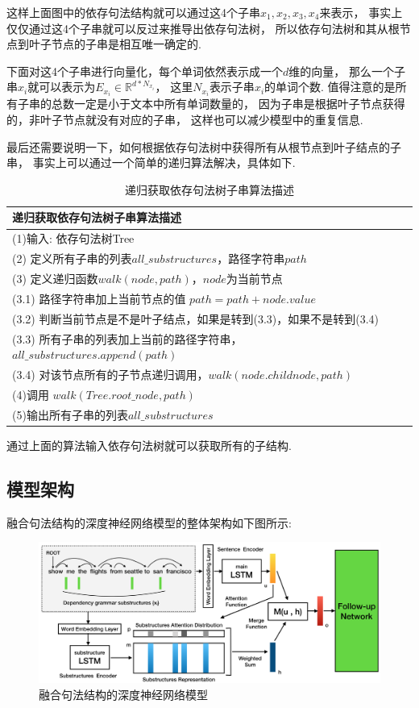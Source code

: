 \documentclass[bachelor,adobefonts]{jnuthesis}
\begin{document}
这样上面图中的依存句法结构就可以通过这4个子串$x_{1},x_{2},x_{3},x_{4}$来表示，
事实上仅仅通过这4个子串就可以反过来推导出依存句法树，
所以依存句法树和其从根节点到叶子节点的子串是相互唯一确定的.

下面对这4个子串进行向量化，每个单词依然表示成一个$d$维的向量，
那么一个子串$x_{i}$就可以表示为$E_{x_{i}} \in \mathbb{R}^{d*N_{x_{i}}}$，
这里$N_{x_{i}}$表示子串$x_{i}$的单词个数.
值得注意的是所有子串的总数一定是小于文本中所有单词数量的，
因为子串是根据叶子节点获得的，非叶子节点就没有对应的子串，
这样也可以减少模型中的重复信息.

最后还需要说明一下，如何根据依存句法树中获得所有从根节点到叶子结点的子串，
事实上可以通过一个简单的递归算法解决，具体如下.

\begin{table}[h!]
  \centering
  \begin{tabular}{l}
    \toprule
    \textbf{递归获取依存句法树子串算法描述} \\
    \midrule
    (1)输入: 依存句法树Tree \\
    (2) 定义所有子串的列表$all\_substructures$，路径字符串$path$ \\
    (3) 定义递归函数$walk(node,path)$，$node$为当前节点 \\
    (3.1) 路径字符串加上当前节点的值 $path = path + node.value$ \\
    (3.2) 判断当前节点是不是叶子结点，如果是转到(3.3)，如果不是转到(3.4)\\
    (3.3) 所有子串的列表加上当前的路径字符串，$all\_substructures.append(path)$ \\
    (3.4) 对该节点所有的子节点递归调用，$walk(node.childnode,path)$ \\
    (4)调用 $walk(Tree.root\_node,path)$ \\
    (5)输出所有子串的列表$all\_substructures$ \\
    \bottomrule
  \end{tabular}
  \caption{递归获取依存句法树子串算法描述}
\end{table}
通过上面的算法输入依存句法树就可以获取所有的子结构.

\subsection{模型架构}
融合句法结构的深度神经网络模型的整体架构如下图所示:
\begin{figure}[h!]
  \centering
  \includegraphics[width=0.95\linewidth]{model.png}
  \caption{融合句法结构的深度神经网络模型}
\end{figure}
\end{document}
